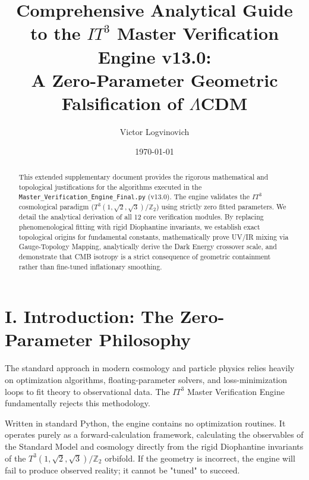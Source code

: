 \documentclass[aps,prd,twocolumn,superscriptaddress,nofootinbib]{revtex4-2}
\begin{document}
\title{Comprehensive Analytical Guide to the \texorpdfstring{$IT^3$}{IT3} Master Verification Engine v13.0: \\ A Zero-Parameter Geometric Falsification of \texorpdfstring{$\Lambda$CDM}{LambdaCDM}}

\author{Victor Logvinovich}

\date{\today}

\begin{abstract}
This extended supplementary document provides the rigorous mathematical and topological justifications for the algorithms executed in the \texttt{Master\_Verification\_Engine\_Final.py} (v13.0). The engine validates the $IT^3$ cosmological paradigm ($T^3(1,\sqrt{2},\sqrt{3})/\mathbb{Z}_2$) using strictly zero fitted parameters. We detail the analytical derivation of all 12 core verification modules. By replacing phenomenological fitting with rigid Diophantine invariants, we establish exact topological origins for fundamental constants, mathematically prove UV/IR mixing via Gauge-Topology Mapping, analytically derive the Dark Energy crossover scale, and demonstrate that CMB isotropy is a strict consequence of geometric containment rather than fine-tuned inflationary smoothing.
\end{abstract}

\maketitle

\section{I. Introduction: The Zero-Parameter Philosophy}

The standard approach in modern cosmology and particle physics relies heavily on optimization algorithms, floating-parameter solvers, and loss-minimization loops to fit theory to observational data. The $IT^3$ Master Verification Engine fundamentally rejects this methodology. 

Written in standard Python, the engine contains no optimization routines. It operates purely as a forward-calculation framework, calculating the observables of the Standard Model and cosmology directly from the rigid Diophantine invariants of the $T^3(1,\sqrt{2},\sqrt{3})/\mathbb{Z}_2$ orbifold. If the geometry is incorrect, the engine will fail to produce observed reality; it cannot be "tuned" to succeed.
\end{document}
